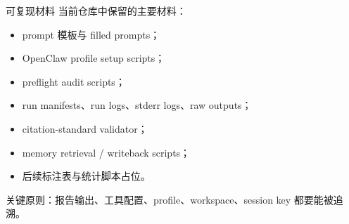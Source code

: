 \documentclass[UTF8,fontset=fandol,aspectratio=169]{ctexbeamer}
\begin{document}
\begin{frame}{可复现材料}
  当前仓库中保留的主要材料：
  \begin{itemize}
    \item prompt 模板与 filled prompts；
    \item OpenClaw profile setup scripts；
    \item preflight audit scripts；
    \item run manifests、run logs、stderr logs、raw outputs；
    \item citation-standard validator；
    \item memory retrieval / writeback scripts；
    \item 后续标注表与统计脚本占位。
  \end{itemize}

  \vspace{0.5em}
  关键原则：报告输出、工具配置、profile、workspace、session key 都要能被追溯。
\end{frame}
\end{document}
